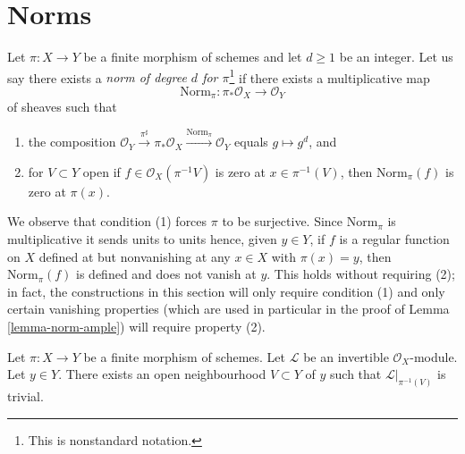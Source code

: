 \section{Norms}
\label{section-norms}

\noindent
Let $\pi : X \to Y$ be a finite morphism of schemes and let $d \geq 1$
be an integer. Let us say there exists a
{\it norm of degree $d$ for $\pi$}\footnote{This is nonstandard
notation.} if there exists a multiplicative map
$$
\text{Norm}_\pi : \pi_*\mathcal{O}_X \to \mathcal{O}_Y
$$
of sheaves such that
\begin{enumerate}
\item the composition
$\mathcal{O}_Y \xrightarrow{\pi^\sharp} \pi_*\mathcal{O}_X
\xrightarrow{\text{Norm}_\pi} \mathcal{O}_Y$ equals $g \mapsto g^d$, and
\item for $V \subset Y$ open if $f \in \mathcal{O}_X(\pi^{-1}V)$
is zero at $x \in \pi^{-1}(V)$, then $\text{Norm}_\pi(f)$
is zero at $\pi(x)$.
\end{enumerate}
We observe that condition (1) forces $\pi$ to be surjective.
Since $\text{Norm}_\pi$ is multiplicative it sends units to units
hence, given $y \in Y$, if $f$ is a regular function on $X$
defined at but nonvanishing at any $x \in X$
with $\pi(x) = y$, then $\text{Norm}_\pi(f)$ is defined
and does not vanish at $y$. This holds without requiring (2);
in fact, the constructions in this section will only require condition (1)
and only certain vanishing properties (which are used in particular
in the proof of Lemma \ref{lemma-norm-ample}) will require property (2).

\begin{lemma}
\label{lemma-finite-trivialize-invertible-upstairs}
Let $\pi : X \to Y$ be a finite morphism of schemes.
Let $\mathcal{L}$ be an invertible $\mathcal{O}_X$-module.
Let $y \in Y$. There exists an open neighbourhood
$V \subset Y$ of $y$ such that $\mathcal{L}|_{\pi^{-1}(V)}$ is trivial.
\end{lemma}

